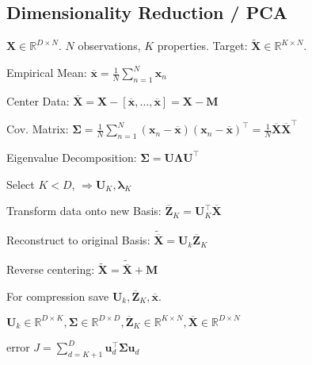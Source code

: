 \documentclass[a4paper, 11pt, landscape]{article}
\begin{document}
\begin{multicols*}{3}
\section{Dimensionality Reduction / PCA}
$\mathbf{X} \in \mathbb{R}^{D \times N}$. $N$ observations, $K$ properties. Target: $\tilde{\mathbf{X}} \in \mathbb{R}^{K \times N}$.
\begin{compactenum}
	\item Empirical Mean: $\overline{\mathbf{x}} = \frac{1}{N} \sum_{n=1}^N \mathbf{x}_n$
	\item Center Data: $\overline{\mathbf{X}} = \mathbf{X} - [\overline{\mathbf{x}}, \ldots, \overline{\mathbf{x}}] = \mathbf{X} - \mathbf{M}$
	\item Cov. Matrix: $\boldsymbol{\Sigma} = \frac{1}{N	} \sum_{n=1}^N (\mathbf{x}_n - \overline{\mathbf{x}}) (\mathbf{x}_n - \overline{\mathbf{x}})^\top = \frac{1}{N} \overline{\mathbf{X}}\overline{\mathbf{X}}^\top$
	\item Eigenvalue Decomposition: $\boldsymbol{\Sigma} = \mathbf{U} \boldsymbol{\Lambda} \mathbf{U}^\top$
	\item Select $K < D$, $\Rightarrow \mathbf{U}_K, \boldsymbol{\lambda}_K$
	\item Transform data onto new Basis: $\overline{\mathbf{Z}}_K = \mathbf{U}_K^\top \overline{\mathbf{X}}$
	\item Reconstruct to original Basis: $\tilde{\overline{\mathbf{X}}} = \mathbf{U}_k \overline{\mathbf{Z}}_K$
	\item Reverse centering: $\tilde{\mathbf{X}} = \tilde{\overline{\mathbf{X}}} + \mathbf{M}$
\end{compactenum}

\begin{compactitem}
	\item For compression save $\mathbf{U}_k, \overline{\mathbf{Z}}_K, \overline{\mathbf{x}}$.
	\item $\mathbf{U}_k \in \mathbb{R}^{D \times K}, \boldsymbol{\Sigma} \in \mathbb{R}^{D \times D}, \overline{\mathbf{Z}}_K \in \mathbb{R}^{K \times N}, \overline{\mathbf{X}} \in \mathbb{R}^{D \times N}$
	\item error $J = \sum^D_{d=K+1} \mathbf{u}^\top_d \bm{\Sigma} \mathbf{u}_d$
\end{compactitem}


\end{multicols*}
\end{document}
